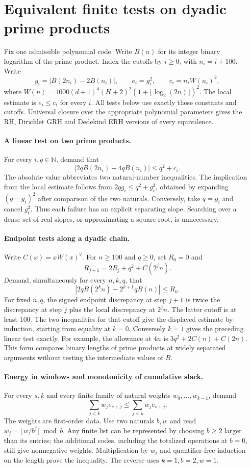 \section{Equivalent finite tests on dyadic prime products}\label{sec:discrete}
Fix one admissible polynomial code. Write $B(n)$ for its integer binary logarithm of the prime product. Index the cutoffs by $i\ge0$, with $n_i=i+100$. Write
\[
 g_i=|B(2n_i)-2B(n_i)|,\qquad
 e_i=g_i^2,\qquad c_i=n_i W(n_i)^2,
\]
where $W(n)=1000(d+1)^4(H+2)^2(1+\lfloor\log_2(2n)\rfloor)^2$.
The local estimate is $e_i\le c_i$ for every $i$. All tests below use exactly these constants and cutoffs. Universal closure over the appropriate polynomial parameters gives the RH, Dirichlet GRH and Dedekind ERH versions of every equivalence.

\paragraph{A linear test on two prime products.}
For every $i,q\in\mathbb N$, demand that
\[
 \big|2qB(2n_i)-4qB(n_i)\big|\le q^2+c_i.
\]
The absolute value abbreviates two natural-number inequalities. The implication from the local estimate follows from $2qg_i\le q^2+g_i^2$, obtained by expanding $(q-g_i)^2$ after comparison of the two naturals. Conversely, take $q=g_i$ and cancel $g_i^2$. Thus each failure has an explicit separating slope. Searching over a dense set of real slopes, or approximating a square root, is unnecessary.

\paragraph{Endpoint tests along a dyadic chain.}
Write $C(x)=x W(x)^2$. For $n\ge100$ and $q\ge0$, set $R_0=0$ and
\[
 R_{j+1}=2R_j+q^2+C(2^j n).
\]
Demand, simultaneously for every $n,k,q$, that
\[
 \left|2q B(2^k n)-2^{k+1}q B(n)\right|\le R_k.
\]
For fixed $n,q$, the signed endpoint discrepancy at step $j+1$ is twice the discrepancy at step $j$ plus the local discrepancy at $2^j n$. The latter cutoff is at least 100. The two inequalities for that cutoff give the displayed estimate by induction, starting from equality at $k=0$. Conversely $k=1$ gives the preceding linear test exactly. For example, the allowance at $4n$ is $3q^2+2C(n)+C(2n)$. This form compares binary lengths of prime products at widely separated arguments without testing the intermediate values of $B$.

\paragraph{Energy in windows and monotonicity of cumulative slack.}
For every $s,k$ and every finite family of natural weights $w_0,\ldots,w_{k-1}$, demand
\[
 \sum_{j<k} w_j e_{s+j}\le \sum_{j<k} w_j c_{s+j}.
\]
The weights are first-order data. Use two naturals $b,w$ and read
$w_j=\lfloor w/b^j\rfloor\bmod b$. Any finite list can be represented by choosing $b\ge2$ larger than its entries; the additional codes, including the totalized operations at $b=0$, still give nonnegative weights. Multiplication by $w_j$ and quantifier-free induction on the length prove the inequality. The reverse uses $k=1,b=2,w=1$.

